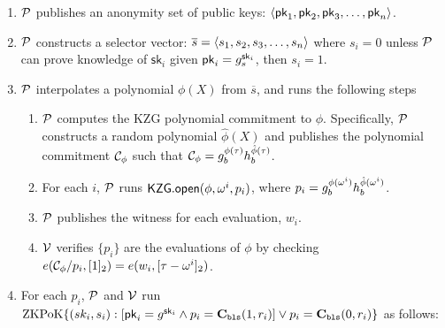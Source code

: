 
\begin{Protocol*}[t!]
    \begin{framed}
    \footnotesize
    \begin{enumerate}
    \item $\mathcal{P}$ publishes an anonymity set of public keys: $\left \langle \mathsf{pk}_1,\mathsf{pk}_2,\mathsf{pk}_3,\dots,\mathsf{pk}_n \right \rangle$.
    \item $\mathcal{P}$ constructs a selector vector: $\overline{s}=\left \langle s_1,s_2,s_3,\ldots,s_n \right \rangle$ where $s_i=0$ unless $\mathcal{P}$ can prove knowledge of $\mathsf{sk}_i$ given $\mathsf{pk}_i=g_s^{\mathsf{sk}_i}$, then  $s_i=1$.
    \item $\mathcal{P}$ interpolates a polynomial $\phi(X)$ from $\overline{s}$, and runs the following steps
    \begin{enumerate}
        \item $\mathcal{P}$ computes the KZG polynomial commitment to $\phi$. Specifically, $\mathcal{P}$ constructs a random polynomial $\hat\phi(X)$ and publishes the polynomial commitment $\mathcal{C}_\phi$ such that $\mathcal{C}_\phi=g_b^{\phi(\tau)}h_b^{\hat\phi(\tau)}$.
        \item For each $i$, $\mathcal{P}$ runs $\mathsf{KZG.open}(\phi, \omega^i, p_i)$, where $p_i=g_b^{\phi(\omega^i)}h_b^{\hat\phi(\omega^i)}$.
        \item $\mathcal{P}$ publishes the witness for each evaluation, $w_i$.
        \item $\mathcal{V}$ verifies $\{p_i\}$ are the evaluations of $\phi$ by checking $e(\mathcal{C}_\phi/p_i, [1]_2)=e(w_i, [\tau-\omega^i]_2)$.
    \end{enumerate}
    \item For each $p_i$, $\mathcal{P}$ and $\mathcal{V}$ run $\mathrm{ZKPoK} \{ (sk_i,s_i) :  [\mathsf{pk}_i=g^{\mathsf{sk}_i} \land p_i=\textbf{C}_\texttt{bls}(1,r_i)  ] \lor p_i=\textbf{C}_\texttt{bls}(0,r_i) \}$ as follows:
    

\end{enumerate}
\end{framed}
\end{Protocol*}
